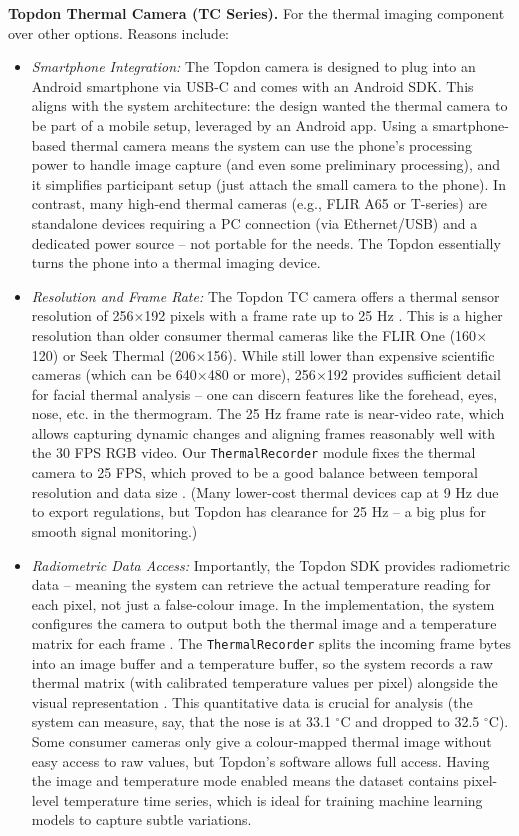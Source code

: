 \textbf{Topdon Thermal Camera (TC Series).} For the thermal imaging component over other options. Reasons include:
\begin{itemize}
    \item \emph{Smartphone Integration:} The Topdon camera is designed to plug into an Android smartphone via USB-C and comes with an Android SDK. This aligns with the system architecture: the design wanted the thermal camera to be part of a mobile setup, leveraged by an Android app. Using a smartphone-based thermal camera means the system can use the phone's processing power to handle image capture (and even some preliminary processing), and it simplifies participant setup (just attach the small camera to the phone). In contrast, many high-end thermal cameras (e.g., FLIR A65 or T-series) are standalone devices requiring a PC connection (via Ethernet/USB) and a dedicated power source -- not portable for the needs. The Topdon essentially turns the phone into a thermal imaging device.
    \item \emph{Resolution and Frame Rate:} The Topdon TC camera offers a thermal sensor resolution of 256$\times$192 pixels with a frame rate up to 25 Hz \cite{ref20}. This is a higher resolution than older consumer thermal cameras like the FLIR One (160$\times$120) or Seek Thermal (206$\times$156). While still lower than expensive scientific cameras (which can be 640$\times$480 or more), 256$\times$192 provides sufficient detail for facial thermal analysis -- one can discern features like the forehead, eyes, nose, etc. in the thermogram. The 25 Hz frame rate is near-video rate, which allows capturing dynamic changes and aligning frames reasonably well with the 30 FPS RGB video. Our \texttt{ThermalRecorder} module fixes the thermal camera to 25 FPS, which proved to be a good balance between temporal resolution and data size \cite{ref20}. (Many lower-cost thermal devices cap at 9 Hz due to export regulations, but Topdon has clearance for 25 Hz -- a big plus for smooth signal monitoring.)
    \item \emph{Radiometric Data Access:} Importantly, the Topdon SDK provides radiometric data -- meaning the system can retrieve the actual temperature reading for each pixel, not just a false-colour image. In the implementation, the system configures the camera to output both the thermal image and a temperature matrix for each frame \cite{ref20}. The \texttt{ThermalRecorder} splits the incoming frame bytes into an image buffer and a temperature buffer, so the system records a raw thermal matrix (with calibrated temperature values per pixel) alongside the visual representation \cite{ref20}. This quantitative data is crucial for analysis (the system can measure, say, that the nose is at 33.1 $^\circ$C and dropped to 32.5 $^\circ$C). Some consumer cameras only give a colour-mapped thermal image without easy access to raw values, but Topdon's software allows full access. Having the image and temperature mode enabled \cite{ref20} means the dataset contains pixel-level temperature time series, which is ideal for training machine learning models to capture subtle variations.

\end{itemize}
